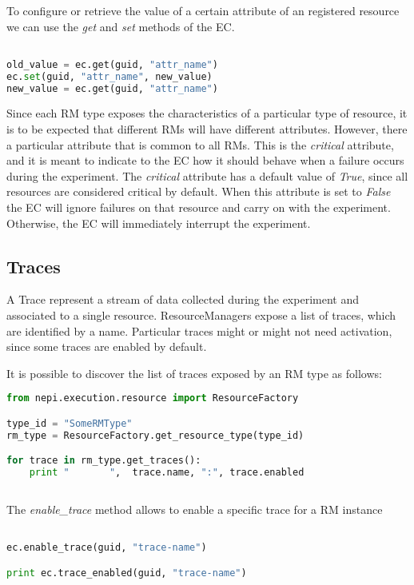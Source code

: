 To configure or retrieve the value of a certain attribute of
an registered resource we can use the \emph{get} and \emph{set}
methods of the EC.

\begin{lstlisting}[language=Python]

old_value = ec.get(guid, "attr_name")
ec.set(guid, "attr_name", new_value)
new_value = ec.get(guid, "attr_name")

\end{lstlisting}

Since each RM type exposes the characteristics of a particular type
of resource, it is to be expected that different RMs will have different
attributes. However, there a particular attribute that is common to all RMs.
This is the \emph{critical} attribute, and it is meant to indicate to the EC
how it should behave when a failure occurs during the experiment. 
The \emph{critical} attribute has a default value of \emph{True}, since
all resources are considered critical by default. 
When this attribute is set to \emph{False} the EC will ignore failures on that 
resource and carry on with the experiment. Otherwise, the EC will immediately 
interrupt the experiment.


\subsection{Traces}

A Trace represent a stream of data collected during the experiment and associated
to a single resource. ResourceManagers expose a list of traces, which are identified
by a name. Particular traces might or might not need activation, since some traces
are enabled by default.

It is possible to discover the list of traces exposed by an 
RM type as follows:

\begin{lstlisting}[language=Python]
from nepi.execution.resource import ResourceFactory

type_id = "SomeRMType"
rm_type = ResourceFactory.get_resource_type(type_id)

for trace in rm_type.get_traces():
    print "       ",  trace.name, ":", trace.enabled
    
\end{lstlisting}

The \emph{enable\_trace} method allows to enable a specific trace for a 
RM instance

\begin{lstlisting}[language=Python]

ec.enable_trace(guid, "trace-name")

print ec.trace_enabled(guid, "trace-name")

\end{lstlisting}


